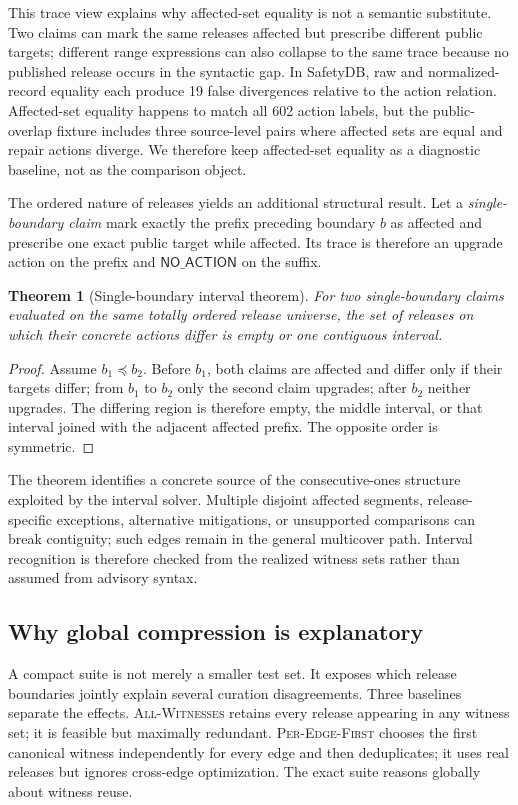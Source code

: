 \documentclass[10pt,conference]{IEEEtran}
\newtheorem{theorem}{Theorem}
\newcommand{\noaction}{\ensuremath{\mathsf{NO\_ACTION}}}
\begin{document}
This trace view explains why affected-set equality is not a semantic substitute. Two claims can mark the same releases affected but prescribe different public targets; different range expressions can also collapse to the same trace because no published release occurs in the syntactic gap. In SafetyDB, raw and normalized-record equality each produce 19 false divergences relative to the action relation. Affected-set equality happens to match all 602 action labels, but the public-overlap fixture includes three source-level pairs where affected sets are equal and repair actions diverge. We therefore keep affected-set equality as a diagnostic baseline, not as the comparison object.

The ordered nature of releases yields an additional structural result. Let a \emph{single-boundary claim} mark exactly the prefix preceding boundary $b$ as affected and prescribe one exact public target while affected. Its trace is therefore an upgrade action on the prefix and \noaction{} on the suffix.

\begin{theorem}[Single-boundary interval theorem]
For two single-boundary claims evaluated on the same totally ordered release universe, the set of releases on which their concrete actions differ is empty or one contiguous interval.
\end{theorem}
\begin{proof}
Assume $b_1\preceq b_2$. Before $b_1$, both claims are affected and differ only if their targets differ; from $b_1$ to $b_2$ only the second claim upgrades; after $b_2$ neither upgrades. The differing region is therefore empty, the middle interval, or that interval joined with the adjacent affected prefix. The opposite order is symmetric.
\end{proof}

The theorem identifies a concrete source of the consecutive-ones structure exploited by the interval solver. Multiple disjoint affected segments, release-specific exceptions, alternative mitigations, or unsupported comparisons can break contiguity; such edges remain in the general multicover path. Interval recognition is therefore checked from the realized witness sets rather than assumed from advisory syntax.

\subsection{Why global compression is explanatory}
A compact suite is not merely a smaller test set. It exposes which release boundaries jointly explain several curation disagreements. Three baselines separate the effects. \textsc{All-Witnesses} retains every release appearing in any witness set; it is feasible but maximally redundant. \textsc{Per-Edge-First} chooses the first canonical witness independently for every edge and then deduplicates; it uses real releases but ignores cross-edge optimization. The exact suite reasons globally about witness reuse.
\end{document}
